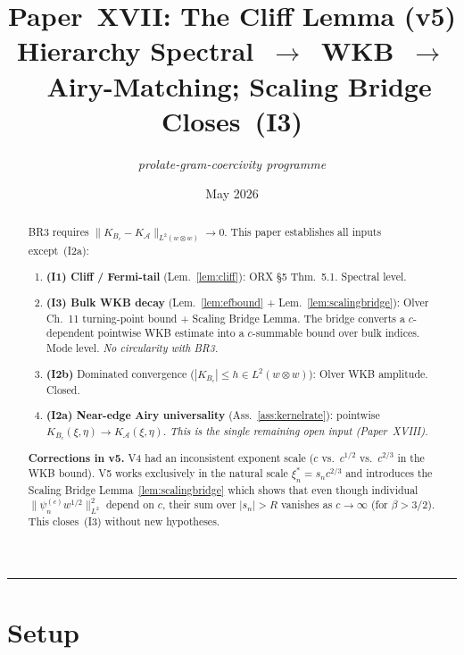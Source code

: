 \documentclass[12pt,a4paper]{amsart}
\theoremstyle{definition}
\newcommand{\cA}{\mathcal{A}}
\newcommand{\cK}{K_{B_c}}
\newcommand{\cKA}{K_{\cA}}
\begin{document}
\title[Paper XVII: The Cliff Lemma]{%
  Paper~XVII: The Cliff Lemma (v5)\\[0.3em]
  \large Hierarchy Spectral~$\to$~WKB~$\to$~Airy-Matching;
  Scaling Bridge Closes~(I3)}

\author{\textit{prolate-gram-coercivity programme}}
\date{May 2026}

\begin{abstract}
BR3 requires $\|\cK-\cKA\|_{L^2(w\otimes w)}\to 0$.
This paper establishes all inputs except~(I2a):
\begin{enumerate}[nosep]
  \item \textbf{(I1) Cliff / Fermi-tail} (Lem.~\ref{lem:cliff}):
    ORX \S5 Thm.~5.1. Spectral level.
  \item \textbf{(I3) Bulk WKB decay} (Lem.~\ref{lem:efbound}
    + Lem.~\ref{lem:scalingbridge}):
    Olver Ch.~11 turning-point bound + Scaling Bridge Lemma.
    The bridge converts a $c$-dependent pointwise WKB estimate
    into a $c$-summable bound over bulk indices.
    Mode level. \emph{No circularity with BR3.}
  \item \textbf{(I2b)} Dominated convergence
    ($|\cK|\leq h\in L^2(w\otimes w)$):
    Olver WKB amplitude. Closed.
  \item \textbf{(I2a) Near-edge Airy universality}
    (Ass.~\ref{ass:kernelrate}):
    pointwise $\cK(\xi,\eta)\to\cKA(\xi,\eta)$.
    \emph{This is the single remaining open input (Paper~XVIII).}
\end{enumerate}

\medskip\noindent
\textbf{Corrections in v5.}
V4 had an inconsistent exponent scale
($c$ vs.\ $c^{1/2}$ vs.\ $c^{2/3}$ in the WKB bound).
V5 works exclusively in the natural scale $\xi_n^* = s_n c^{2/3}$
and introduces the Scaling Bridge Lemma~\ref{lem:scalingbridge}
which shows that even though individual
$\|\psi_n^{(c)}w^{1/2}\|_{L^2}^2$ depend on $c$,
their sum over $|s_n|>R$ vanishes as $c\to\infty$
(for $\beta>3/2$). This closes~(I3) without new hypotheses.
\end{abstract}

\maketitle
\tableofcontents
\bigskip\hrule\bigskip

\section{Setup}
\label{sec:setup}
\end{document}
